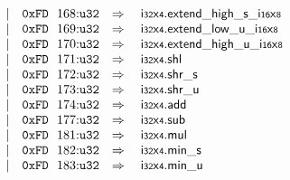 $$\begin{array}[t]{@{}lrrl@{}l@{}l@{}l@{}}
& & | & \mathtt{0xFD}~~168{:}{\mathtt{u32}} & \quad\Rightarrow\quad{} & {\mathsf{i{\scriptstyle 32}}}{\mathsf{x}}{\mathsf{{\scriptstyle 4}}} {.} {{\mathsf{extend}}{\mathsf{\_}}{\mathsf{high}}{\mathsf{\_}}{\mathsf{s}}}{\mathsf{\_}}{{\mathsf{i{\scriptstyle 16}}}{\mathsf{x}}{\mathsf{{\scriptstyle 8}}}} \\
& & | & \mathtt{0xFD}~~169{:}{\mathtt{u32}} & \quad\Rightarrow\quad{} & {\mathsf{i{\scriptstyle 32}}}{\mathsf{x}}{\mathsf{{\scriptstyle 4}}} {.} {{\mathsf{extend}}{\mathsf{\_}}{\mathsf{low}}{\mathsf{\_}}{\mathsf{u}}}{\mathsf{\_}}{{\mathsf{i{\scriptstyle 16}}}{\mathsf{x}}{\mathsf{{\scriptstyle 8}}}} \\
& & | & \mathtt{0xFD}~~170{:}{\mathtt{u32}} & \quad\Rightarrow\quad{} & {\mathsf{i{\scriptstyle 32}}}{\mathsf{x}}{\mathsf{{\scriptstyle 4}}} {.} {{\mathsf{extend}}{\mathsf{\_}}{\mathsf{high}}{\mathsf{\_}}{\mathsf{u}}}{\mathsf{\_}}{{\mathsf{i{\scriptstyle 16}}}{\mathsf{x}}{\mathsf{{\scriptstyle 8}}}} \\
& & | & \mathtt{0xFD}~~171{:}{\mathtt{u32}} & \quad\Rightarrow\quad{} & {\mathsf{i{\scriptstyle 32}}}{\mathsf{x}}{\mathsf{{\scriptstyle 4}}} {.} \mathsf{shl} \\
& & | & \mathtt{0xFD}~~172{:}{\mathtt{u32}} & \quad\Rightarrow\quad{} & {\mathsf{i{\scriptstyle 32}}}{\mathsf{x}}{\mathsf{{\scriptstyle 4}}} {.} {\mathsf{shr}}{\mathsf{\_}}{\mathsf{s}} \\
& & | & \mathtt{0xFD}~~173{:}{\mathtt{u32}} & \quad\Rightarrow\quad{} & {\mathsf{i{\scriptstyle 32}}}{\mathsf{x}}{\mathsf{{\scriptstyle 4}}} {.} {\mathsf{shr}}{\mathsf{\_}}{\mathsf{u}} \\
& & | & \mathtt{0xFD}~~174{:}{\mathtt{u32}} & \quad\Rightarrow\quad{} & {\mathsf{i{\scriptstyle 32}}}{\mathsf{x}}{\mathsf{{\scriptstyle 4}}} {.} \mathsf{add} \\
& & | & \mathtt{0xFD}~~177{:}{\mathtt{u32}} & \quad\Rightarrow\quad{} & {\mathsf{i{\scriptstyle 32}}}{\mathsf{x}}{\mathsf{{\scriptstyle 4}}} {.} \mathsf{sub} \\
& & | & \mathtt{0xFD}~~181{:}{\mathtt{u32}} & \quad\Rightarrow\quad{} & {\mathsf{i{\scriptstyle 32}}}{\mathsf{x}}{\mathsf{{\scriptstyle 4}}} {.} \mathsf{mul} \\
& & | & \mathtt{0xFD}~~182{:}{\mathtt{u32}} & \quad\Rightarrow\quad{} & {\mathsf{i{\scriptstyle 32}}}{\mathsf{x}}{\mathsf{{\scriptstyle 4}}} {.} {\mathsf{min}}{\mathsf{\_}}{\mathsf{s}} \\
& & | & \mathtt{0xFD}~~183{:}{\mathtt{u32}} & \quad\Rightarrow\quad{} & {\mathsf{i{\scriptstyle 32}}}{\mathsf{x}}{\mathsf{{\scriptstyle 4}}} {.} {\mathsf{min}}{\mathsf{\_}}{\mathsf{u}} \\

\end{array}$$
